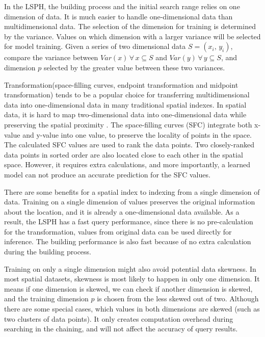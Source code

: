 In the LSPH, the building process and the initial search range relies on one dimension of data. It is much easier to handle one-dimensional data than multidimensional data. The selection of the dimension for training is determined by the variance. Values on which dimension with a larger variance will be selected for model training. Given a series of two dimensional data $S = (x_i,\, y_i)$, compare the variance between $Var(x) \, \forall \, x \subseteq S$ and $Var(y) \, \forall \, y \subseteq S$, and dimension $p$ selected by the greater value between these two variances.


Transformation(space-filling curves, endpoint transformation and midpoint transformation) tends to be a popular choice for transferring multidimensional data into one-dimensional data in many traditional spatial indexes. In spatial data, it is hard to map two-dimensional data into one-dimensional data while preserving the spatial proximity \cite{Gaede:1998fp}. The space-filling curves (SFC) integrate both x-value and y-value into one value, to preserve the locality of points in the space. The calculated SFC values are used to rank the data points. Two closely-ranked data points in sorted order are also located close to each other in the spatial space. However, it requires extra calculations, and more importantly, a learned model can not produce an accurate prediction for the SFC values. 


There are some benefits for a spatial index to indexing from a single dimension of data. Training on a single dimension of values preserves the original information about the location, and it is already a one-dimensional data available. As a result, the LSPH has a fast query performance, since there is no pre-calculation for the transformation, values from original data can be used directly for inference. The building performance is also fast because of no extra calculation during the building process. 

Training on only a single dimension might also avoid potential data skewness. In most spatial datasets, skewness is most likely to happen in only one dimension. It means if one dimension is skewed, we can check if another dimension is skewed, and the training dimension $p$ is chosen from the less skewed out of two. Although there are some special cases, which values in both dimensions are skewed (such as two clusters of data points). It only creates computation overhead during searching in the chaining, and will not affect the accuracy of query results. 

